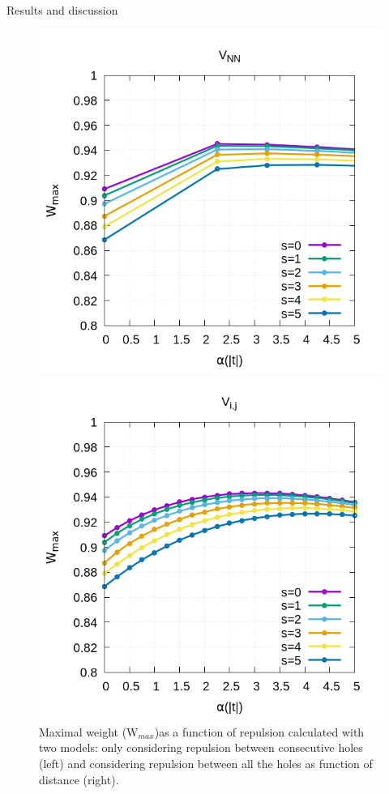 \documentclass[12pt,twoside]{report}
\begin{document}
\begin{chapter}{Results and discussion}
	\begin{figure}[h!]
		\centering
		\hspace{-2cm}
		\begin{minipage}{0.4\textwidth}
			\includegraphics[scale=0.4]{Wmax_vs_xrep0v1.png}
		\end{minipage}
		\hspace{2cm}
		\begin{minipage}{0.4\textwidth}
			\includegraphics[scale=0.4]{Wmax_vs_xrep0vn.png}
		\end{minipage}
		\caption{\label{fig_v1n} Maximal weight (W$_{max}$)as a function of repulsion calculated with two models: only considering repulsion between consecutive holes (left) and considering repulsion between all the holes as function of distance (right). }
	\end{figure}
	

\end{chapter}
\end{document}
